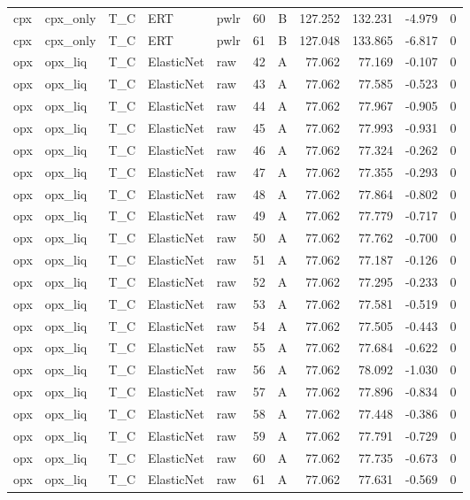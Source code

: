 \begin{longtable}{lllllrrrrrr}
cpx & cpx\_only & T\_C & ERT & pwlr & 60 & B & 127.252 & 132.231 & -4.979 & 0 \\
cpx & cpx\_only & T\_C & ERT & pwlr & 61 & B & 127.048 & 133.865 & -6.817 & 0 \\
opx & opx\_liq & T\_C & ElasticNet & raw & 42 & A & 77.062 & 77.169 & -0.107 & 0 \\
opx & opx\_liq & T\_C & ElasticNet & raw & 43 & A & 77.062 & 77.585 & -0.523 & 0 \\
opx & opx\_liq & T\_C & ElasticNet & raw & 44 & A & 77.062 & 77.967 & -0.905 & 0 \\
opx & opx\_liq & T\_C & ElasticNet & raw & 45 & A & 77.062 & 77.993 & -0.931 & 0 \\
opx & opx\_liq & T\_C & ElasticNet & raw & 46 & A & 77.062 & 77.324 & -0.262 & 0 \\
opx & opx\_liq & T\_C & ElasticNet & raw & 47 & A & 77.062 & 77.355 & -0.293 & 0 \\
opx & opx\_liq & T\_C & ElasticNet & raw & 48 & A & 77.062 & 77.864 & -0.802 & 0 \\
opx & opx\_liq & T\_C & ElasticNet & raw & 49 & A & 77.062 & 77.779 & -0.717 & 0 \\
opx & opx\_liq & T\_C & ElasticNet & raw & 50 & A & 77.062 & 77.762 & -0.700 & 0 \\
opx & opx\_liq & T\_C & ElasticNet & raw & 51 & A & 77.062 & 77.187 & -0.126 & 0 \\
opx & opx\_liq & T\_C & ElasticNet & raw & 52 & A & 77.062 & 77.295 & -0.233 & 0 \\
opx & opx\_liq & T\_C & ElasticNet & raw & 53 & A & 77.062 & 77.581 & -0.519 & 0 \\
opx & opx\_liq & T\_C & ElasticNet & raw & 54 & A & 77.062 & 77.505 & -0.443 & 0 \\
opx & opx\_liq & T\_C & ElasticNet & raw & 55 & A & 77.062 & 77.684 & -0.622 & 0 \\
opx & opx\_liq & T\_C & ElasticNet & raw & 56 & A & 77.062 & 78.092 & -1.030 & 0 \\
opx & opx\_liq & T\_C & ElasticNet & raw & 57 & A & 77.062 & 77.896 & -0.834 & 0 \\
opx & opx\_liq & T\_C & ElasticNet & raw & 58 & A & 77.062 & 77.448 & -0.386 & 0 \\
opx & opx\_liq & T\_C & ElasticNet & raw & 59 & A & 77.062 & 77.791 & -0.729 & 0 \\
opx & opx\_liq & T\_C & ElasticNet & raw & 60 & A & 77.062 & 77.735 & -0.673 & 0 \\
opx & opx\_liq & T\_C & ElasticNet & raw & 61 & A & 77.062 & 77.631 & -0.569 & 0 \\

\end{longtable}
